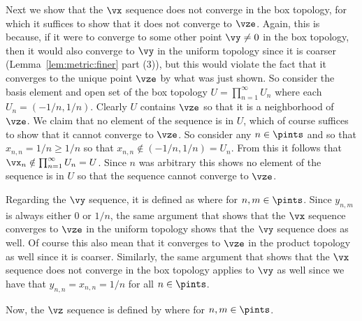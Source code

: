 {{    Next we show that the $\vx$ sequence does not converge in the box topology, for which it suffices to show that it does not converge to $\vze$.
    Again, this is because, if it were to converge to some other point $\vy \neq 0$ in the box topology, then it would also converge to $\vy$ in the uniform topology since it is coarser (Lemma~\ref{lem:metric:finer} part (3)), but this would violate the fact that it converges to the unique point $\vze$ by what was just shown.
    So consider the basis element and open set of the box topology $U = \prod_{n=1}^\infty U_n$ where each $U_n = (-1/n, 1/n)$.
    Clearly $U$ contains $\vze$ so that it is a neighborhood of $\vze$.
    We claim that no element of the sequence is in $U$, which of course suffices to show that it cannot converge to $\vze$.
    So consider any $n \in \pints$ and so that $x_{n,n} = 1/n \geq 1/n$ so that $x_{n,n} \notin (-1/n, 1/n) = U_n$.
    From this it follows that $\vx_n \notin \prod_{n=1}^\infty U_n = U$.
    Since $n$ was arbitrary this shows no element of the sequence is in $U$ so that the sequence cannot converge to $\vze$.

    Regarding the $\vy$ sequence, it is defined as
    where
    for $n,m \in \pints$.
    Since $y_{n,m}$ is always either $0$ or $1/n$, the same argument that shows that the $\vx$ sequence converges to $\vze$ in the uniform topology shows that the $\vy$ sequence does as well.
    Of course this also mean that it converges to $\vze$ in the product topology as well since it is coarser.
    Similarly, the same argument that shows that the $\vx$ sequence does not converge in the box topology applies to $\vy$ as well since we have that $y_{n,n} = x_{n,n} = 1/n$ for all $n \in \pints$.

    Now, the $\vz$ sequence is defined by
    where
    for $n,m \in \pints$.

}}
